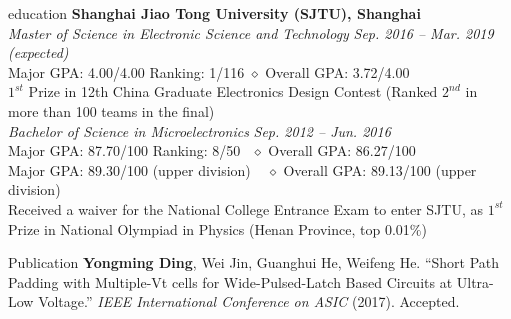 \documentclass{resume_Stanford} %
\begin{document}

\begin{rSection}{education}
\textbf{Shanghai Jiao Tong University (SJTU), Shanghai}
\\\emph{Master of Science in Electronic Science and Technology} \hfill \emph{Sep. 2016 -- Mar. 2019 (expected)}
\\\bm{$\diamond$} Major GPA: 4.00/4.00 \qquad Ranking: 1/116 \qquad $\diamond$ Overall GPA: 3.72/4.00
\\\bm{$\diamond$} $1^{st}$ Prize in 12th China Graduate Electronics Design Contest (Ranked $2^{nd}$ in more than 100 teams in the final)
\\\emph{Bachelor of Science in Microelectronics} \hfill \emph{Sep. 2012 -- Jun. 2016}
\\\bm{$\diamond$} Major GPA: 87.70/100 \qquad Ranking: 8/50 \qquad \ $\diamond$ Overall GPA: 86.27/100
\\\bm{$\diamond$} Major GPA: 89.30/100 (upper division)\ \ \;\,\qquad\quad$\diamond$ Overall GPA: 89.13/100 (upper division)
\\\bm{$\diamond$} Received a waiver for the National College Entrance Exam to enter SJTU, as $1^{st}$ Prize in National Olympiad in Physics (Henan Province, top 0.01$\%$)
\end{rSection}

\begin{rSection}{Publication}
\textbf{Yongming Ding}, Wei Jin, Guanghui He, Weifeng He. ``Short Path Padding with Multiple-Vt cells for Wide-Pulsed-Latch Based Circuits at Ultra-Low Voltage.'' \emph{IEEE International Conference on ASIC}  (2017). Accepted.
\end{rSection}
\end{document}
